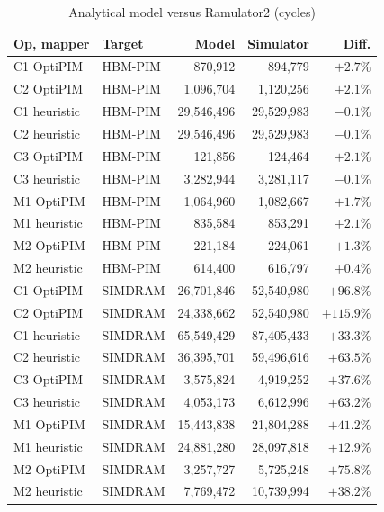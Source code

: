 \documentclass[conference]{IEEEtran}
\begin{document}
\begin{table}[t]
\centering
\caption{Analytical model versus Ramulator2 (cycles)}
\label{tab:sim}
\footnotesize
\begin{tabular}{llrrr}
\toprule
Op, mapper & Target & Model & Simulator & Diff. \\
\midrule
C1 OptiPIM & HBM-PIM & 870{,}912 & 894{,}779 & $+2.7\%$ \\
C2 OptiPIM & HBM-PIM & 1{,}096{,}704 & 1{,}120{,}256 & $+2.1\%$ \\
C1 heuristic & HBM-PIM & 29{,}546{,}496 & 29{,}529{,}983 & $-0.1\%$ \\
C2 heuristic & HBM-PIM & 29{,}546{,}496 & 29{,}529{,}983 & $-0.1\%$ \\
C3 OptiPIM & HBM-PIM & 121{,}856 & 124{,}464 & $+2.1\%$ \\
C3 heuristic & HBM-PIM & 3{,}282{,}944 & 3{,}281{,}117 & $-0.1\%$ \\
M1 OptiPIM & HBM-PIM & 1{,}064{,}960 & 1{,}082{,}667 & $+1.7\%$ \\
M1 heuristic & HBM-PIM & 835{,}584 & 853{,}291 & $+2.1\%$ \\
M2 OptiPIM & HBM-PIM & 221{,}184 & 224{,}061 & $+1.3\%$ \\
M2 heuristic & HBM-PIM & 614{,}400 & 616{,}797 & $+0.4\%$ \\
C1 OptiPIM & SIMDRAM & 26{,}701{,}846 & 52{,}540{,}980 & $+96.8\%$ \\
C2 OptiPIM & SIMDRAM & 24{,}338{,}662 & 52{,}540{,}980 & $+115.9\%$ \\
C1 heuristic & SIMDRAM & 65{,}549{,}429 & 87{,}405{,}433 & $+33.3\%$ \\
C2 heuristic & SIMDRAM & 36{,}395{,}701 & 59{,}496{,}616 & $+63.5\%$ \\
C3 OptiPIM & SIMDRAM & 3{,}575{,}824 & 4{,}919{,}252 & $+37.6\%$ \\
C3 heuristic & SIMDRAM & 4{,}053{,}173 & 6{,}612{,}996 & $+63.2\%$ \\
M1 OptiPIM & SIMDRAM & 15{,}443{,}838 & 21{,}804{,}288 & $+41.2\%$ \\
M1 heuristic & SIMDRAM & 24{,}881{,}280 & 28{,}097{,}818 & $+12.9\%$ \\
M2 OptiPIM & SIMDRAM & 3{,}257{,}727 & 5{,}725{,}248 & $+75.8\%$ \\
M2 heuristic & SIMDRAM & 7{,}769{,}472 & 10{,}739{,}994 & $+38.2\%$ \\
\bottomrule
\end{tabular}
\end{table}
\end{document}
